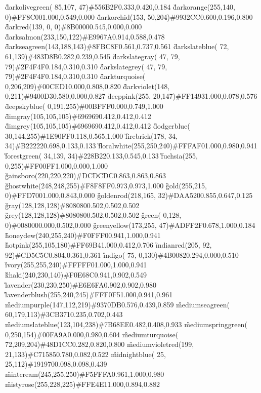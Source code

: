 \G{darkolivegreen}{( 85,107, 47)}{\#556B2F}{0.333,0.420,0.184}
\G{darkorange}{(255,140,  0)}{\#FF8C00}{1.000,0.549,0.000}
\G{darkorchid}{(153, 50,204)}{\#9932CC}{0.600,0.196,0.800}
\G{darkred}{(139,  0,  0)}{\#8B0000}{0.545,0.000,0.000}
\G{darksalmon}{(233,150,122)}{\#E9967A}{0.914,0.588,0.478}
\G{darkseagreen}{(143,188,143)}{\#8FBC8F}{0.561,0.737,0.561}
\G{darkslateblue}{( 72, 61,139)}{\#483D8B}{0.282,0.239,0.545}
\G{darkslategray}{( 47, 79, 79)}{\#2F4F4F}{0.184,0.310,0.310}
\G{darkslategrey}{( 47, 79, 79)}{\#2F4F4F}{0.184,0.310,0.310}
\G{darkturquoise}{(  0,206,209)}{\#00CED1}{0.000,0.808,0.820}
\G{darkviolet}{(148,  0,211)}{\#9400D3}{0.580,0.000,0.827}
\G{deeppink}{(255, 20,147)}{\#FF1493}{1.000,0.078,0.576}
\G{deepskyblue}{(  0,191,255)}{\#00BFFF}{0.000,0.749,1.000}
\G{dimgray}{(105,105,105)}{\#696969}{0.412,0.412,0.412}
\G{dimgrey}{(105,105,105)}{\#696969}{0.412,0.412,0.412}
\G{dodgerblue}{( 30,144,255)}{\#1E90FF}{0.118,0.565,1.000}
\G{firebrick}{(178, 34, 34)}{\#B22222}{0.698,0.133,0.133}
\G{floralwhite}{(255,250,240)}{\#FFFAF0}{1.000,0.980,0.941}
\G{forestgreen}{( 34,139, 34)}{\#228B22}{0.133,0.545,0.133}
\G{fuchsia}{(255,  0,255)}{\#FF00FF}{1.000,0.000,1.000}
\G{gainsboro}{(220,220,220)}{\#DCDCDC}{0.863,0.863,0.863}
\G{ghostwhite}{(248,248,255)}{\#F8F8FF}{0.973,0.973,1.000}
\G{gold}{(255,215,  0)}{\#FFD700}{1.000,0.843,0.000}
\G{goldenrod}{(218,165, 32)}{\#DAA520}{0.855,0.647,0.125}
\G{gray}{(128,128,128)}{\#808080}{0.502,0.502,0.502}
\G{grey}{(128,128,128)}{\#808080}{0.502,0.502,0.502}
\G{green}{(  0,128,  0)}{\#008000}{0.000,0.502,0.000}
\G{greenyellow}{(173,255, 47)}{\#ADFF2F}{0.678,1.000,0.184}
\G{honeydew}{(240,255,240)}{\#F0FFF0}{0.941,1.000,0.941}
\G{hotpink}{(255,105,180)}{\#FF69B4}{1.000,0.412,0.706}
\G{indianred}{(205, 92, 92)}{\#CD5C5C}{0.804,0.361,0.361}
\G{indigo}{( 75,  0,130)}{\#4B0082}{0.294,0.000,0.510}
\G{ivory}{(255,255,240)}{\#FFFFF0}{1.000,1.000,0.941}
\G{khaki}{(240,230,140)}{\#F0E68C}{0.941,0.902,0.549}
\G{lavender}{(230,230,250)}{\#E6E6FA}{0.902,0.902,0.980}
\G{lavenderblush}{(255,240,245)}{\#FFF0F5}{1.000,0.941,0.961}
\G{mediumpurple}{(147,112,219)}{\#9370DB}{0.576,0.439,0.859}
\G{mediumseagreen}{( 60,179,113)}{\#3CB371}{0.235,0.702,0.443}
\G{mediumslateblue}{(123,104,238)}{\#7B68EE}{0.482,0.408,0.933}
\G{mediumspringgreen}{(  0,250,154)}{\#00FA9A}{0.000,0.980,0.604}
\G{mediumturquoise}{( 72,209,204)}{\#48D1CC}{0.282,0.820,0.800}
\G{mediumvioletred}{(199, 21,133)}{\#C71585}{0.780,0.082,0.522}
\G{midnightblue}{( 25, 25,112)}{\#191970}{0.098,0.098,0.439}
\G{mintcream}{(245,255,250)}{\#F5FFFA}{0.961,1.000,0.980}
\G{mistyrose}{(255,228,225)}{\#FFE4E1}{1.000,0.894,0.882}
